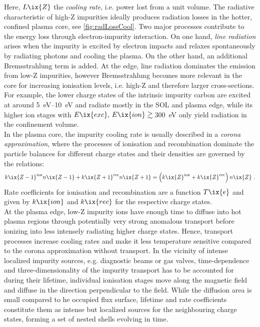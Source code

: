             Here, $L\ix{Z}$ the \textit{cooling rate}, i.e. power lost from a unit volume. The radiative characteristic of high-Z impurities ideally produces radiation losses in the hotter, confined plasma core, see \cref{fig:radLossCool}. Two major processes contribute to the  energy loss through electron-impurity interaction. On one hand, \textit{line radiation} arises when the impurity is excited by electron impacts and relaxes spontaneously by radiating photons and cooling the plasma. On the other hand, an additional Bremsstrahlung term is added. At the edge, line radiation dominates the emission from low-Z impurities, however Bremsstrahlung becomes more relevant in the core for increasing ionisation levels, i.e. high-Z and therefore larger cross-sections. For example, the lower charge states of the intrinsic impurity carbon are excited at around \SIrange{5}{10}{\electronvolt} and radiate mostly in the SOL and plasma edge, while its higher ion stages with $E\ix{exc},\,E\ix{ion}\gtrsim\,$\SI{300}{\electronvolt} only yield radiation in the confinement volume\cite{Ohtsuka1982}.\\%
            In the plasma core, the impurity cooling rate is usually described in a \textit{corona approximation}, where the processes of ionisation and recombination dominate the particle balances for different charge states and their densities are governed by the relations:
%
            \begin{align}%
                k\ix{Z-1}^{\text{ion}}n\ix{Z-1}+k\ix{Z+1}^{\text{rec}}n\ix{Z+1}=\left(k\ix{Z}^{\text{ion}}+k\ix{Z}^{\text{rec}}\right)n\ix{Z}\,\,.\nonumber%
            \end{align}%
%
            Rate coefficients for ionisation and recombination are a function $T\ix{e}$ and given by $k\ix{ion}$ and $k\ix{rec}$ for the respective charge states.\\%
            At the plasma edge, low-Z impurity ions have enough time to diffuse into hot plasma regions through potentially very strong anomalous transport before ionizing into less intensely radiating higher charge states. Hence, transport processes increase cooling rates and make it less temperature sensitive compared to the corona approximation without transport. In the vicinity of intense localized impurity sources, e.g. diagnostic beams or gas valves, time-dependence and three-dimensionality of the impurity transport has to be accounted for during their lifetime, individual ionisation stages move along the magnetic field and diffuse in the direction perpendicular to the field. While the diffusion area is small compared to he occupied flux surface, lifetime and rate coefficients constitute them as intense but localized sources for the neighbouring charge states, forming a set of nested shells evolving in time.\\%
%
